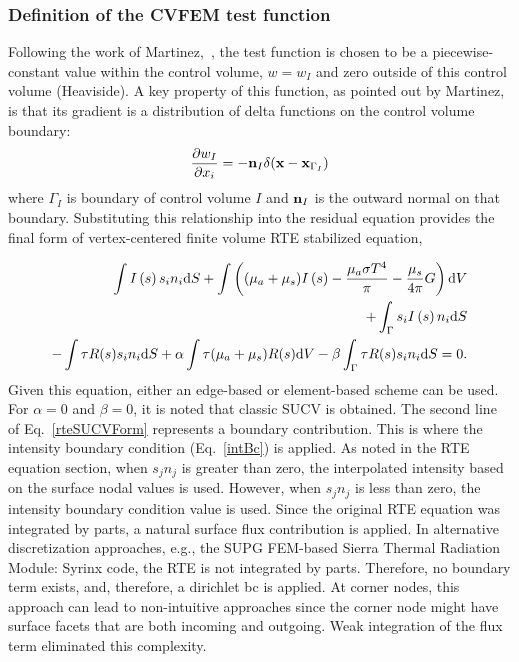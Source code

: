 \subsubsection{Definition of the CVFEM test function}
Following the work of Martinez,~\cite{Martinez:2005}, the test function is chosen to be a 
piecewise-constant value within the control volume, $w = w_I$ and zero outside of this control volume (Heaviside).
A key property of this function, as pointed out by Martinez, is that its
gradient is a distribution of delta functions on the control volume
boundary:
\begin{equation}
\frac{\partial w_I}{\partial x_i} = - {\bf n}_I \delta({\bf x} - {\bf x}_{\Gamma_I})
\label{eqn:GradPiecewiseConstant}
\end{equation}
where $\Gamma_I$ is boundary of control volume $I$ and ${\bf n}_I$
is the outward normal on that boundary.  Substituting this relationship into the residual equation provides
the final form of vertex-centered finite volume RTE stabilized equation,

\begin{eqnarray}
   \int I\left(s\right) s_i n_i {\rm d}S + \int \left( (\mu_a + \mu_s ) I\left(s\right) 
   - {{\mu_a \sigma T^4} \over {\pi}} -\frac{\mu_s}{4\pi}G \right) {\rm d}V  \nonumber \\
+ \int_\Gamma s_i I\left(s\right) n_i {\rm d}S \nonumber \\
 - \int \tau R(s) s_i n_i {\rm d}S +\alpha \int \tau (\mu_a +\mu_s) R(s) {\rm d}V -\beta \int_\Gamma \tau R(s) s_i n_i {\rm d}S= 0.
\label{rteSUCVForm}
\end{eqnarray}
Given this equation, either an edge-based or element-based scheme can be used. For $\alpha = 0$ and $\beta = 0$, it 
is noted that classic SUCV is obtained. The second line of Eq.~\ref{rteSUCVForm} represents a boundary contribution. 
This is where the intensity boundary condition (Eq.~\ref{intBc}) is applied. As noted in the RTE equation section, 
when $s_j n_j$ is greater than zero, the interpolated intensity based on
the surface nodal values is used. However, when $s_j n_j$ is less than zero, the intensity boundary condition 
value is used. Since the original RTE equation was integrated 
by parts, a natural surface flux contribution is applied. In alternative discretization approaches, e.g., the
SUPG FEM-based Sierra Thermal Radiation Module: Syrinx code, the RTE is not integrated by parts. Therefore, 
no boundary term exists, and, therefore, a dirichlet bc is applied. At corner nodes, this approach can lead 
to non-intuitive approaches since the corner node might have surface facets that are both incoming and outgoing. 
Weak integration of the flux term eliminated this complexity.

